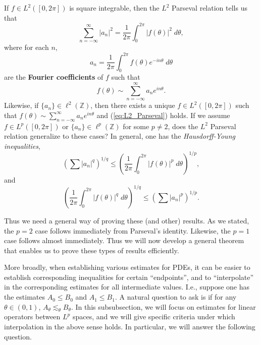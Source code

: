 \documentclass{article}
\begin{document}
If $f \in L^{2}([0,2\pi])$ is square integrable, then the $L^{2}$ Parseval relation tells us that 
\begin{equation}
	\sum_{n = -\infty}^{\infty}|a_{n}|^{2} = \frac{1}{2\pi}\int_{0}^{2\pi}|f(\theta)|^{2}\;d\theta, 
	\label{eq:L2_Parseval}
\end{equation}
where for each $n$, 
\begin{equation*}
	a_{n} = \frac{1}{2\pi}\int_{0}^{2\pi}f(\theta)e^{-in\theta}\;d\theta 
\end{equation*}
are the \textbf{Fourier coefficients} of $f$ such that 
\begin{equation*}
	f(\theta) \sim \sum_{n = -\infty}^{\infty}a_{n}e^{in\theta}. 
\end{equation*}
Likewise, if $\{a_{n}\} \in \ell^{2}(\mathbb{Z})$, then there exists a unique $f \in L^{2}([0,2\pi])$ such that $f(\theta) \sim \sum_{n = -\infty}^{\infty}a_{n}e^{in\theta}$ and (\ref{eq:L2_Parseval}) holds. If we assume $f \in L^{p}([0,2\pi])$ or $\{a_{n}\} \in \ell^{p}(\mathbb{Z})$ for some $p \neq 2$, does the $L^{2}$ Parseval relation generalize to these cases? In general, one has the \textit{Hausdorff-Young inequalities}, 
\begin{equation*}
	\left(\sum |a_{n}|^{q}\right)^{1/q} \leq \left(\frac{1}{2\pi}\int_{0}^{2\pi}|f(\theta)|^{p}\;d\theta\right)^{1/p}, 
\end{equation*}
and 
\begin{equation*}
	\left(\frac{1}{2\pi}\int_{0}^{2\pi}|f(\theta)|^{q}\;d\theta\right)^{1/q} \leq \left(\sum |a_{n}|^{p}\right)^{1/p}. 
\end{equation*}

Thus we need a general way of proving these (and other) results. As we stated, the $p = 2$ case follows immediately from Parseval's identity. Likewise, the $p = 1$ case follows almost immediately. Thus we will now develop a general theorem that enables us to prove these types of results efficiently. 

More broadly, when establishing various estimates for PDEs, it can be easier to establish corresponding inequalities for certain ``endpoints'', and to ``interpolate'' in the corresponding estimates for all intermediate values. I.e., suppose one has the estimates $A_{0} \leq B_{0}$ and $A_{1} \leq B_{1}$. A natural question to ask is if for any $\theta \in (0,1)$, $A_{\theta} \lesssim_{\theta} B_{\theta}$. In this subsubsection, we will focus on estimates for linear operators between $L^{p}$ spaces, and we will give specific criteria under which interpolation in the above sense holds. In particular, we will answer the following question. 
\end{document}
